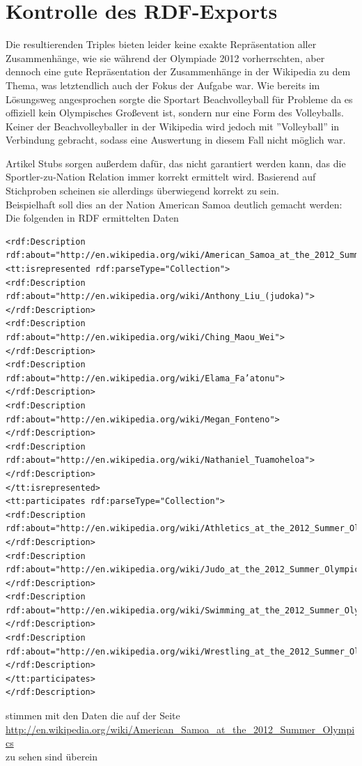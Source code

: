 \documentclass[pagesize=auto, titlepage=on]{scrartcl}
\begin{document}
\section{Kontrolle des RDF-Exports}
Die resultierenden Triples bieten leider keine exakte Repräsentation aller Zusammenhänge, wie sie
während der Olympiade 2012 vorherrschten, aber dennoch eine gute Repräsentation der Zusammenhänge in der Wikipedia zu dem Thema, was letztendlich auch der Fokus der Aufgabe war.
Wie bereits im Lösungsweg angesprochen sorgte die Sportart Beachvolleyball für Probleme da es offiziell kein Olympisches Großevent ist, sondern nur eine Form des Volleyballs.
Keiner der Beachvolleyballer in der Wikipedia wird jedoch mit ''Volleyball'' in Verbindung gebracht, sodass eine Auswertung in diesem Fall nicht möglich war.

Artikel Stubs sorgen außerdem dafür, das nicht garantiert werden kann, das die Sportler-zu-Nation Relation immer korrekt ermittelt wird.
Basierend auf Stichproben scheinen sie allerdings überwiegend korrekt zu sein.\\
\clearpage
Beispielhaft soll dies an der Nation American Samoa deutlich gemacht werden:\\
Die folgenden in RDF ermittelten Daten
\begingroup

\begin{lstlisting}<rdf:Description rdf:about="http://en.wikipedia.org/wiki/American_Samoa_at_the_2012_Summer_Olympics">
<tt:isrepresented rdf:parseType="Collection">
<rdf:Description rdf:about="http://en.wikipedia.org/wiki/Anthony_Liu_(judoka)">
</rdf:Description>
<rdf:Description rdf:about="http://en.wikipedia.org/wiki/Ching_Maou_Wei">
</rdf:Description>
<rdf:Description rdf:about="http://en.wikipedia.org/wiki/Elama_Fa’atonu">
</rdf:Description>
<rdf:Description rdf:about="http://en.wikipedia.org/wiki/Megan_Fonteno">
</rdf:Description>
<rdf:Description rdf:about="http://en.wikipedia.org/wiki/Nathaniel_Tuamoheloa">
</rdf:Description>
</tt:isrepresented>
<tt:participates rdf:parseType="Collection">
<rdf:Description rdf:about="http://en.wikipedia.org/wiki/Athletics_at_the_2012_Summer_Olympics">
</rdf:Description>
<rdf:Description rdf:about="http://en.wikipedia.org/wiki/Judo_at_the_2012_Summer_Olympics">
</rdf:Description>
<rdf:Description rdf:about="http://en.wikipedia.org/wiki/Swimming_at_the_2012_Summer_Olympics">
</rdf:Description>
<rdf:Description rdf:about="http://en.wikipedia.org/wiki/Wrestling_at_the_2012_Summer_Olympics">
</rdf:Description>
</tt:participates>
</rdf:Description>\end{lstlisting}
stimmen mit den Daten die auf der Seite\\ \href{http://en.wikipedia.org/wiki/American_Samoa_at_the_2012_Summer_Olympics}{http://en.wikipedia.org/wiki/American\_Samoa\_at\_the\_2012\_Summer\_Olympics}\\ zu sehen sind überein
\end{document}
